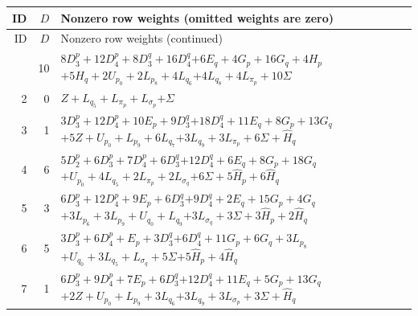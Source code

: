 \documentclass[11pt,a4paper]{article}
\theoremstyle{remark}
\begin{document}
\begingroup\footnotesize
\setlength{\tabcolsep}{4pt}
\begin{longtable}{rrp{12.7cm}}
\toprule
ID&$D$&Nonzero row weights (omitted weights are zero)\\
\midrule\endfirsthead
\toprule ID&$D$&Nonzero row weights (continued)\\\midrule\endhead
\bottomrule\endfoot
1&10&\( 8D_3^p + 12D_4^p + 8D_3^q + 16D_4^q \)\newline\( + 6E_q + 4G_p + 16G_q + 4H_p \)\newline\( + 5H_q + 2U_{p_{0}} + 2L_{p_{8}} + 4L_{q_{6}} \)\newline\( + 4L_{q_{8}} + 4L_{\pi_p} + 10\Sigma \)\\[3pt]
2&0&\( Z + L_{q_{5}} + L_{\pi_p} + L_{\sigma_p} \)\newline\( + \Sigma \)\\[3pt]
3&1&\( 3D_3^p + 12D_4^p + 10E_p + 9D_3^q \)\newline\( + 18D_4^q + 11E_q + 8G_p + 13G_q \)\newline\( + 5Z + U_{p_{0}} + L_{p_{9}} + 6L_{q_{7}} \)\newline\( + 3L_{q_{9}} + 3L_{\pi_p} + 6\Sigma + \widehat H_q \)\\[3pt]
4&6&\( 5D_2^p + 6D_3^p + 7D_4^p + 6D_3^q \)\newline\( + 12D_4^q + 6E_q + 8G_p + 18G_q \)\newline\( + U_{p_{0}} + 4L_{q_{5}} + 2L_{\pi_p} + 2L_{\sigma_q} \)\newline\( + 6\Sigma + 5\widehat H_p + 6\widehat H_q \)\\[3pt]
5&3&\( 6D_3^p + 12D_4^p + 9E_p + 6D_3^q \)\newline\( + 9D_4^q + 2E_q + 15G_p + 4G_q \)\newline\( + 3L_{p_{6}} + 3L_{p_{9}} + U_{q_{0}} + L_{q_{9}} \)\newline\( + 3L_{\sigma_q} + 3\Sigma + 3\widehat H_p + 2\widehat H_q \)\\[3pt]
6&5&\( 3D_3^p + 6D_4^p + E_p + 3D_3^q \)\newline\( + 6D_4^q + 11G_p + 6G_q + 3L_{p_{8}} \)\newline\( + U_{q_{0}} + 3L_{q_{5}} + L_{\sigma_q} + 5\Sigma \)\newline\( + 5\widehat H_p + 4\widehat H_q \)\\[3pt]
7&1&\( 6D_3^p + 9D_4^p + 7E_p + 6D_3^q \)\newline\( + 12D_4^q + 11E_q + 5G_p + 13G_q \)\newline\( + 2Z + U_{p_{0}} + L_{p_{9}} + 3L_{q_{6}} \)\newline\( + 3L_{q_{9}} + 3L_{\sigma_p} + 3\Sigma + \widehat H_q \)\\[3pt]

\end{longtable}
\end{document}
